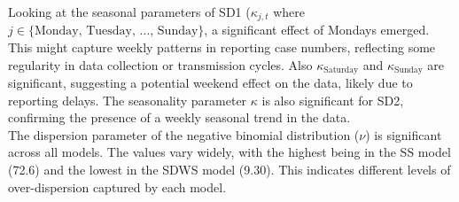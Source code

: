Looking at the seasonal parameters of SD1 ($\kappa_{j,t}$ where $j \in \{\text{Monday, Tuesday, } \dots\text{, Sunday}\}$, a significant effect of Mondays emerged. This might capture weekly patterns in reporting case numbers, reflecting some regularity in data collection or transmission cycles. Also $\kappa_{\text{Saturday}}$ and $\kappa_{\text{Sunday}}$ are significant, suggesting a potential weekend effect on the data, likely due to reporting delays. The seasonality parameter $\kappa$ is also significant for SD2, confirming the presence of a weekly seasonal trend in the data.\\

The dispersion parameter of the negative binomial distribution ($\nu$) is significant across all models. The values vary widely, with the highest being in the SS model (72.6) and the lowest in the SDWS model (9.30). This indicates different levels of over-dispersion captured by each model. \\

